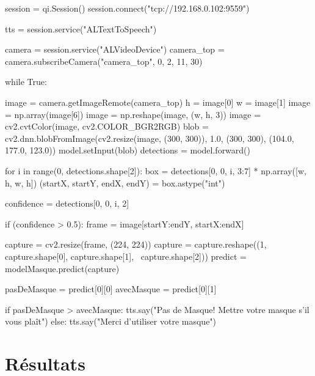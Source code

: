\documentclass{cubeamer}
\newcommand{\tab}{\- \- \- \-}
\begin{document}
\begin{frame}[fragile]
\begin{semiverbatim}
session = qi.Session()
session.connect("tcp://192.168.0.102:9559")

tts = session.service("ALTextToSpeech")

camera = session.service("ALVideoDevice")
camera_top = camera.subscribeCamera("camera_top", 0, 2, 11, 30)
\end{semiverbatim}
\end{frame}

\begin{frame}[fragile]
\begin{semiverbatim}
while True:

\tab image = camera.getImageRemote(camera_top)
\tab h = image[0]
\tab w = image[1]
\tab image = np.array(image[6])
\tab image = np.reshape(image, (w, h, 3))
\tab image = cv2.cvtColor(image, cv2.COLOR_BGR2RGB)
\tab blob = cv2.dnn.blobFromImage(cv2.resize(image, (300, 300)), 1.0, 
\tab \tab \tab (300, 300), (104.0, 177.0, 123.0))
\tab model.setInput(blob)
\tab detections = model.forward()
\end{semiverbatim}
\end{frame}

\begin{frame}[fragile]
\begin{semiverbatim}
for i in range(0, detections.shape[2]):
\tab box = detections[0, 0, i, 3:7] * np.array([w, h, w, h])
\tab (startX, startY, endX, endY) = box.astype("int")

\tab confidence = detections[0, 0, i, 2]

\tab if (confidence > 0.5):
\tab \tab frame = image[startY:endY, startX:endX]

\tab \tab capture = cv2.resize(frame, (224, 224))
\tab \tab capture = capture.reshape((1, capture.shape[0], capture.shape[1],\ \tab \tab \tab \tab \tab capture.shape[2]))
\tab \tab predict = modelMasque.predict(capture)
\end{semiverbatim}
\end{frame}

\begin{frame}[fragile]
\begin{semiverbatim}
pasDeMasque = predict[0][0]
avecMasque = predict[0][1]

if pasDeMasque > avecMasque:
\tab tts.say("Pas de Masque! Mettre votre masque s'il vous plaît")
else:
\tab tts.say("Merci d'utiliser votre masque")
\end{semiverbatim}
\end{frame}

\section{Résultats}
\end{document}
